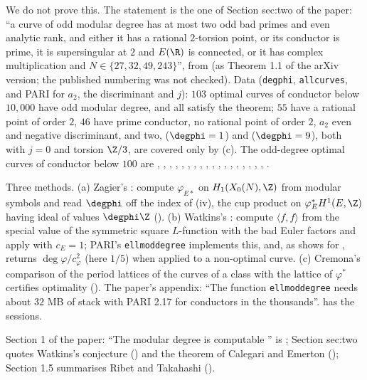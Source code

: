 We do not prove this. The statement is the one of Section sec:two of the paper: ``a curve of odd modular degree has at most two odd bad primes and even analytic rank, and either it has a
rational $2$-torsion point, or its conductor is prime, it is supersingular at $2$ and $E(\R)$ is connected, or it has complex multiplication and $N\in\{27,32,49,243\}$'', from
\cite{CalegariEmerton09} (as Theorem 1.1 of the arXiv version; the published numbering was not checked). Data (\texttt{degphi}, \texttt{allcurves}, and PARI for $a_2$, the discriminant and $j$): $103$
optimal curves of conductor below $10{,}000$ have odd modular degree, and all satisfy the theorem; $55$ have a rational point of order $2$, $46$ have prime conductor, no rational point of order $2$,
$a_2$ even and negative discriminant, and two,  ($\degphi=1$) and  ($\degphi=9$), both with $j=0$ and torsion $\Z/3$, are covered only by (c). The odd-degree optimal curves of
conductor below $100$ are , , , , , , , , , , , , , ,
, , , , .

\begin{remark}\label{rem:moddeg:computing-the-degree}
Three methods. (a) Zagier's \cite{Zagier85}: compute $\varphi_{E*}$ on $H_1(X_0(N),\Z)$ from modular symbols and read $\degphi$ off the index of (iv), the cup product
on $\varphi_E^*H^1(E,\Z)$ having ideal of values $\degphi\Z$ (\cite[Chapter II]{Cremona97}). (b) Watkins's \cite{Watkins02}: compute $\langle f,f\rangle$ from the special value of the symmetric square $L$-function
with the bad Euler factors and apply  with $c_E=1$; PARI's \texttt{ellmoddegree} implements this, and, as  shows for , returns
$\deg\varphi/c_\varphi^2$ (here $1/5$) when applied to a non-optimal curve. (c) Cremona's comparison of the period lattices of the curves of a class with the lattice of $\varphi^*$ certifies optimality
(). The paper's appendix: ``The function \texttt{ellmoddegree} needs about $32$ MB of stack with PARI 2.17 for conductors in the thousands''. 
has the sessions.
\end{remark}

\begin{paperlink}\label{pl:moddeg:two}
Section 1 of the paper: ``The modular degree is computable \cite{Cremona97,Watkins02}'' is ; Section sec:two quotes Watkins's conjecture
() and the theorem of Calegari and Emerton (); Section 1.5 summarises Ribet and Takahashi ().
\end{paperlink}

